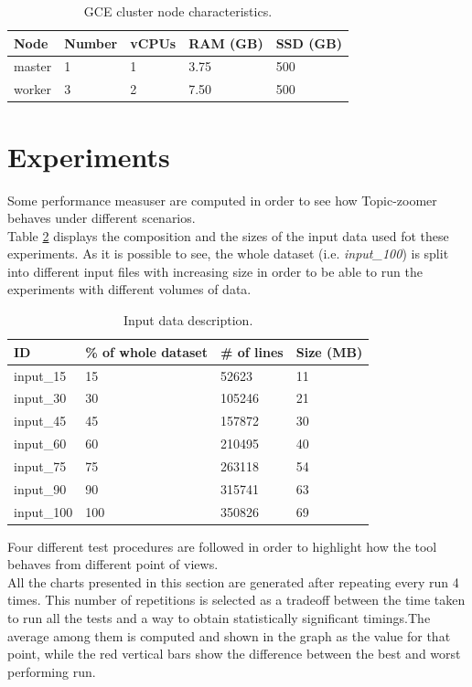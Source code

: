 \documentclass{sig-alternate-05-2015}
\begin{document}
\begin{table}[]
    \centering
    \caption{GCE cluster node characteristics.}
    \label{cluster}
    \begin{tabular}{lllll}
    \hline
    Node   & Number & vCPUs & RAM (GB) & SSD (GB) \\
    \hline
    master & 1      & 1     & 3.75     & 500      \\
    worker & 3      & 2     & 7.50     & 500     
    \end{tabular}
\end{table}


\section{Experiments}\label{experiments}
Some performance measuser are computed in order to see how Topic-zoomer behaves under different scenarios.\\

Table \ref{datasets} displays the composition and the sizes of the input data used fot these experiments. As it is possible to see, the whole dataset (i.e. \emph{input\_100}) is split into different input files with increasing size in order to be able to run the experiments with different volumes of data.

\begin{table}[]
    \centering
    \caption{Input data description.}
    \label{datasets}
    \begin{tabular}{llll}
    \hline
    ID         & \% of whole dataset & \# of lines & Size (MB) \\
    \hline
    input\_15  & 15                  & 52623       & 11        \\
    input\_30  & 30                  & 105246      & 21        \\
    input\_45  & 45                  & 157872      & 30        \\
    input\_60  & 60                  & 210495      & 40        \\
    input\_75  & 75                  & 263118      & 54        \\
    input\_90  & 90                  & 315741      & 63        \\
    input\_100 & 100                 & 350826      & 69       
    \end{tabular}
\end{table}

Four different test procedures are followed in order to highlight how the tool behaves from different point of views.\\
All the charts presented in this section are generated after repeating every run 4 times. This number of repetitions is selected as a tradeoff between the time taken to run all the tests and a way to obtain statistically significant timings.The average among them is computed and shown in the graph as the value for that point, while the red vertical bars show the difference between the best and worst performing run.\\
\end{document}
